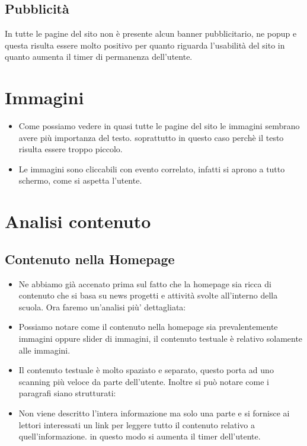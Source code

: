 \documentclass[12pt]{article}
\begin{document}
\subsection{Pubblicit\`a}
In tutte le pagine del sito non \`e presente alcun banner pubblicitario, ne popup e questa risulta essere molto positivo per quanto riguarda l'usabilit\`a del sito in quanto aumenta il timer di permanenza dell'utente.



\section{Immagini}
\begin{itemize}
\item Come possiamo vedere in quasi tutte le pagine del sito le immagini sembrano avere pi\`u importanza del testo. soprattutto in questo caso perch\`e il testo risulta essere troppo piccolo.

\item Le immagini sono cliccabili con evento correlato, infatti si aprono a tutto schermo, come si aspetta l'utente.
\end{itemize}

\section{Analisi contenuto}
\subsection{Contenuto nella Homepage}
\begin{itemize}
	\item Ne abbiamo gi\`a accenato prima sul fatto che la homepage sia ricca di contenuto che si basa su news progetti e attivit\`a svolte all'interno della scuola. Ora faremo un'analisi pi\`u' dettagliata:

	\item Possiamo notare come il contenuto nella homepage sia prevalentemente immagini oppure slider di immagini, il contenuto testuale \`e relativo solamente alle immagini. 
	\item Il contenuto testuale \`e  molto spaziato e separato, questo porta ad uno scanning pi\`u  veloce da parte dell'utente. Inoltre si pu\`o  notare come i paragrafi siano strutturati:

	\item Non viene descritto l'intera informazione ma solo una parte e si fornisce  ai lettori interessati un link per leggere tutto il contenuto relativo a quell'informazione. in questo modo si aumenta il timer dell'utente.	 
\end{itemize}
\newpage
\end{document}
